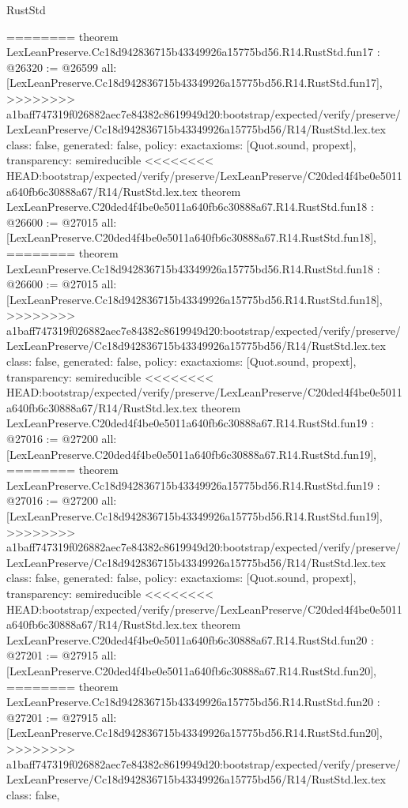 \begin{lexlean}{RustStd}
\begin{coremodule}
{\begin{coremodule}
{{{{{{{{{{{{{{{{{{{{========
theorem LexLeanPreserve.Cc18d942836715b43349926a15775bd56.R14.RustStd.fun17 : @26320 := @26599 {
  all: [LexLeanPreserve.Cc18d942836715b43349926a15775bd56.R14.RustStd.fun17],
>>>>>>>> a1baff747319f026882aec7e84382c8619949d20:bootstrap/expected/verify/preserve/LexLeanPreserve/Cc18d942836715b43349926a15775bd56/R14/RustStd.lex.tex
  class: false,
  generated: false,
  policy: exact{axioms: [Quot.sound, propext]},
  transparency: semireducible
}
<<<<<<<< HEAD:bootstrap/expected/verify/preserve/LexLeanPreserve/C20ded4f4be0e5011a640fb6c30888a67/R14/RustStd.lex.tex
theorem LexLeanPreserve.C20ded4f4be0e5011a640fb6c30888a67.R14.RustStd.fun18 : @26600 := @27015 {
  all: [LexLeanPreserve.C20ded4f4be0e5011a640fb6c30888a67.R14.RustStd.fun18],
========
theorem LexLeanPreserve.Cc18d942836715b43349926a15775bd56.R14.RustStd.fun18 : @26600 := @27015 {
  all: [LexLeanPreserve.Cc18d942836715b43349926a15775bd56.R14.RustStd.fun18],
>>>>>>>> a1baff747319f026882aec7e84382c8619949d20:bootstrap/expected/verify/preserve/LexLeanPreserve/Cc18d942836715b43349926a15775bd56/R14/RustStd.lex.tex
  class: false,
  generated: false,
  policy: exact{axioms: [Quot.sound, propext]},
  transparency: semireducible
}
<<<<<<<< HEAD:bootstrap/expected/verify/preserve/LexLeanPreserve/C20ded4f4be0e5011a640fb6c30888a67/R14/RustStd.lex.tex
theorem LexLeanPreserve.C20ded4f4be0e5011a640fb6c30888a67.R14.RustStd.fun19 : @27016 := @27200 {
  all: [LexLeanPreserve.C20ded4f4be0e5011a640fb6c30888a67.R14.RustStd.fun19],
========
theorem LexLeanPreserve.Cc18d942836715b43349926a15775bd56.R14.RustStd.fun19 : @27016 := @27200 {
  all: [LexLeanPreserve.Cc18d942836715b43349926a15775bd56.R14.RustStd.fun19],
>>>>>>>> a1baff747319f026882aec7e84382c8619949d20:bootstrap/expected/verify/preserve/LexLeanPreserve/Cc18d942836715b43349926a15775bd56/R14/RustStd.lex.tex
  class: false,
  generated: false,
  policy: exact{axioms: [Quot.sound, propext]},
  transparency: semireducible
}
<<<<<<<< HEAD:bootstrap/expected/verify/preserve/LexLeanPreserve/C20ded4f4be0e5011a640fb6c30888a67/R14/RustStd.lex.tex
theorem LexLeanPreserve.C20ded4f4be0e5011a640fb6c30888a67.R14.RustStd.fun20 : @27201 := @27915 {
  all: [LexLeanPreserve.C20ded4f4be0e5011a640fb6c30888a67.R14.RustStd.fun20],
========
theorem LexLeanPreserve.Cc18d942836715b43349926a15775bd56.R14.RustStd.fun20 : @27201 := @27915 {
  all: [LexLeanPreserve.Cc18d942836715b43349926a15775bd56.R14.RustStd.fun20],
>>>>>>>> a1baff747319f026882aec7e84382c8619949d20:bootstrap/expected/verify/preserve/LexLeanPreserve/Cc18d942836715b43349926a15775bd56/R14/RustStd.lex.tex
  class: false,
}}}}}}}}}}}}}}}}}}}}}}}}
\end{coremodule}}
\end{coremodule}
\end{lexlean}
